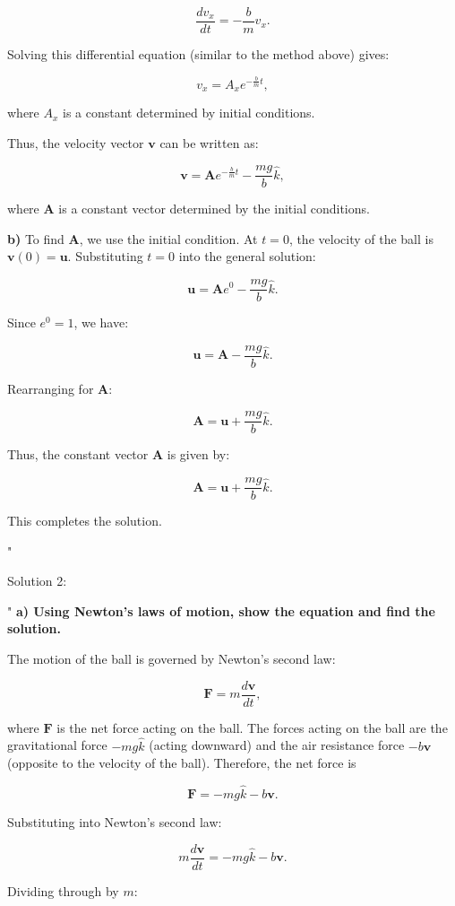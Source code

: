 \[
\frac{d v_x}{dt} = -\frac{b}{m} v_x.
\]

Solving this differential equation (similar to the method above) gives:

\[
v_x = A_x e^{-\frac{b}{m}t},
\]

where $A_x$ is a constant determined by initial conditions.

Thus, the velocity vector $\mathbf{v}$ can be written as:

\[
\mathbf{v} = \mathbf{A} e^{-\frac{b}{m}t} - \frac{mg}{b} \hat{k},
\]

where $\mathbf{A}$ is a constant vector determined by the initial conditions.

\textbf{b)} To find $\mathbf{A}$, we use the initial condition. At $t = 0$, the velocity of the ball is $\mathbf{v}(0) = \mathbf{u}$. Substituting $t = 0$ into the general solution:

\[
\mathbf{u} = \mathbf{A} e^{0} - \frac{mg}{b} \hat{k}.
\]

Since $e^{0} = 1$, we have:

\[
\mathbf{u} = \mathbf{A} - \frac{mg}{b} \hat{k}.
\]

Rearranging for $\mathbf{A}$:

\[
\mathbf{A} = \mathbf{u} + \frac{mg}{b} \hat{k}.
\]

Thus, the constant vector $\mathbf{A}$ is given by:

\[
\mathbf{A} = \mathbf{u} + \frac{mg}{b} \hat{k}.
\]

This completes the solution.

"

Solution 2: 

"
\textbf{a) Using Newton's laws of motion, show the equation and find the solution.}

The motion of the ball is governed by Newton's second law:

\[
\mathbf{F} = m \frac{d \mathbf{v}}{dt},
\]

where $\mathbf{F}$ is the net force acting on the ball. The forces acting on the ball are the gravitational force $-mg\hat{k}$ (acting downward) and the air resistance force $-b \mathbf{v}$ (opposite to the velocity of the ball). Therefore, the net force is

\[
\mathbf{F} = -mg\hat{k} - b\mathbf{v}.
\]

Substituting into Newton's second law:

\[
m \frac{d \mathbf{v}}{dt} = -mg\hat{k} - b\mathbf{v}.
\]

Dividing through by $m$:

